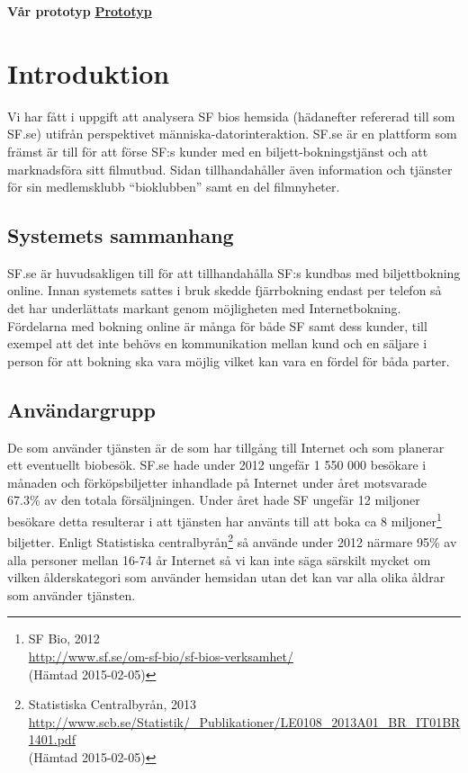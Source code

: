 \documentclass[swedish,a4paper,11pt]{article}
\begin{document}
\newpage
\tableofcontents 

											
\hfill \break
\break										
\textbf{Vår prototyp} \hfill \textbf{\href{http://user.it.uu.se/~mise2899/home.html}{Prototyp}}
\pagebreak


\newpage
\section{Introduktion}

Vi har fått i uppgift att analysera SF bios hemsida (hädanefter refererad till som SF.se) utifrån perspektivet människa-datorinteraktion. SF.se är en plattform som främst är till för att förse SF:s kunder med en biljett-bokningstjänst och att marknadsföra sitt filmutbud. Sidan tillhandahåller även information och tjänster för sin medlemsklubb “bioklubben” samt en del filmnyheter. 
 
\subsection{Systemets sammanhang} 
SF.se är huvudsakligen till för att tillhandahålla SF:s kundbas med biljettbokning online. Innan systemets sattes i bruk skedde fjärrbokning endast per telefon så det har underlättats markant genom möjligheten med Internetbokning. Fördelarna med bokning online är många för både SF samt dess kunder, till exempel att det inte behövs en kommunikation mellan kund och en säljare i person för att bokning ska vara möjlig vilket kan vara en fördel för båda parter.

\subsection{Användargrupp} 
De som använder tjänsten är de som har tillgång till Internet och som planerar ett eventuellt biobesök. SF.se hade under 2012 ungefär 1 550 000 besökare i månaden och förköpsbiljetter inhandlade på Internet under året motsvarade 67.3\% av den totala försäljningen. Under året hade SF ungefär 12 miljoner besökare detta resulterar i att tjänsten har använts till att boka ca 8 miljoner\footnote{SF Bio, 2012  \\
\url{http://www.sf.se/om-sf-bio/sf-bios-verksamhet/}\\ (Hämtad 2015-02-05)} biljetter. Enligt Statistiska centralbyrån\footnote{ Statistiska Centralbyrån, 2013\\ \url{http://www.scb.se/Statistik/_Publikationer/LE0108_2013A01_BR_IT01BR1401.pdf} \\ (Hämtad 2015-02-05)} så använde under 2012 närmare 95\% av alla personer mellan 16-74 år Internet så vi kan inte säga särskilt mycket om vilken ålderskategori som använder hemsidan utan det kan var alla olika åldrar som använder tjänsten.
\end{document}

